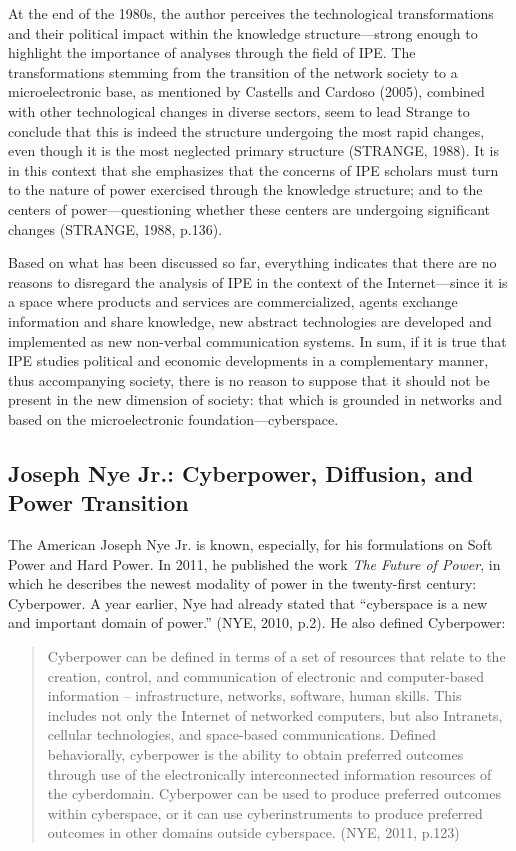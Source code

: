 At the end of the 1980s, the author perceives the technological transformations and their political impact within the knowledge structure---strong enough to highlight the importance of analyses through the field of IPE. The transformations stemming from the transition of the network society to a microelectronic base, as mentioned by Castells and Cardoso (2005), combined with other technological changes in diverse sectors, seem to lead Strange to conclude that this is indeed the structure undergoing the most rapid changes, even though it is the most neglected primary structure (STRANGE, 1988). It is in this context that she emphasizes that the concerns of IPE scholars must turn to the nature of power exercised through the knowledge structure; and to the centers of power---questioning whether these centers are undergoing significant changes (STRANGE, 1988, p.136).

Based on what has been discussed so far, everything indicates that there are no reasons to disregard the analysis of IPE in the context of the Internet---since it is a space where products and services are commercialized, agents exchange information and share knowledge, new abstract technologies are developed and implemented as new non-verbal communication systems. In sum, if it is true that IPE studies political and economic developments in a complementary manner, thus accompanying society, there is no reason to suppose that it should not be present in the new dimension of society: that which is grounded in networks and based on the microelectronic foundation---cyberspace.

\subsection{Joseph Nye Jr.: Cyberpower, Diffusion, and Power Transition}

The American Joseph Nye Jr. is known, especially, for his formulations on Soft Power and Hard Power. In 2011, he published the work \textit{The Future of Power}, in which he describes the newest modality of power in the twenty-first century: Cyberpower. A year earlier, Nye had already stated that ``cyberspace is a new and important domain of power.'' (NYE, 2010, p.2). He also defined Cyberpower:

\begin{quote}
Cyberpower can be defined in terms of a set of resources that relate to the creation, control, and communication of electronic and computer-based information -- infrastructure, networks, software, human skills. This includes not only the Internet of networked computers, but also Intranets, cellular technologies, and space-based communications. Defined behaviorally, cyberpower is the ability to obtain preferred outcomes through use of the electronically interconnected information resources of the cyberdomain. Cyberpower can be used to produce preferred outcomes within cyberspace, or it can use cyberinstruments to produce preferred outcomes in other domains outside cyberspace. (NYE, 2011, p.123)
\end{quote}

